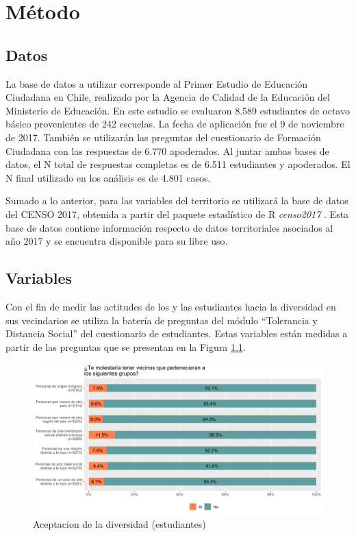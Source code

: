 \documentclass[12pt,twoside]{templates/facsothesis}
\begin{document}
\hypertarget{muxe9todo}{%
\chapter{Método}\label{muxe9todo}}

\hypertarget{datos}{%
\section{Datos}\label{datos}}

La base de datos a utilizar corresponde al Primer Estudio de Educación Ciudadana en Chile, realizado por la Agencia de Calidad de la Educación del Ministerio de Educación. En este estudio se evaluaron 8.589 estudiantes de octavo básico provenientes de 242 escuelas. La fecha de aplicación fue el 9 de noviembre de 2017. También se utilizarán las preguntas del cuestionario de Formación Ciudadana con las respuestas de 6.770 apoderados. Al juntar ambas bases de datos, el N total de respuestas completas es de 6.511 estudiantes y apoderados. El N final utilizado en los análisis es de 4.801 casos.

Sumado a lo anterior, para las variables del territorio se utilizará la base de datos del CENSO 2017, obtenida a partir del paquete estadístico de R \emph{censo2017} \citep{vargas_censo2017_2022}. Esta base de datos contiene información respecto de datos territoriales asociados al año 2017 y se encuentra disponible para su libre uso.

\hypertarget{variables}{%
\section{Variables}\label{variables}}

Con el fin de medir las actitudes de los y las estudiantes hacia la diversidad en sus vecindarios se utiliza la batería de preguntas del módulo ``Tolerancia y Distancia Social'' del cuestionario de estudiantes. Estas variables están medidas a partir de las preguntas que se presentan en la Figura \ref{fig:dep-est}.

\begin{figure}[!ht]

{\centering \includegraphics[width=0.8\linewidth,]{IPO/output/graphs/div_est} 

}

\caption{Aceptacion de la diversidad (estudiantes)}\label{fig:dep-est}
\end{figure}
\end{document}
